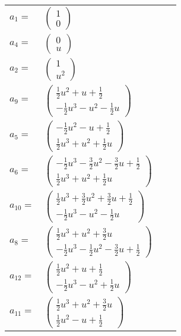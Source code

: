 \documentclass[1p]{elsarticle_modified}
\theoremstyle{definition}
\begin{document}
\begin{tabular}{m{7pt} m{180pt} m{7pt} m{180pt} }
\flushright $a_{1}=$&$\begin{pmatrix}1\\0\end{pmatrix}$ \\
\flushright $a_{4}=$&$\begin{pmatrix}0\\u\end{pmatrix}$ \\
\flushright $a_{2}=$&$\begin{pmatrix}1\\u^2\end{pmatrix}$ \\
\flushright $a_{9}=$&$\begin{pmatrix}\frac{1}{2} u^2+u+\frac{1}{2}\\-\frac{1}{2} u^3- u^2-\frac{1}{2} u\end{pmatrix}$ \\
\flushright $a_{5}=$&$\begin{pmatrix}-\frac{1}{2} u^2- u+\frac{1}{2}\\\frac{1}{2} u^3+u^2+\frac{1}{2} u\end{pmatrix}$ \\
\flushright $a_{6}=$&$\begin{pmatrix}-\frac{1}{2} u^3-\frac{3}{2} u^2-\frac{3}{2} u+\frac{1}{2}\\\frac{1}{2} u^3+u^2+\frac{1}{2} u\end{pmatrix}$ \\
\flushright $a_{10}=$&$\begin{pmatrix}\frac{1}{2} u^3+\frac{3}{2} u^2+\frac{3}{2} u+\frac{1}{2}\\-\frac{1}{2} u^3- u^2-\frac{1}{2} u\end{pmatrix}$ \\
\flushright $a_{8}=$&$\begin{pmatrix}\frac{1}{2} u^3+u^2+\frac{3}{2} u\\-\frac{1}{2} u^3-\frac{1}{2} u^2-\frac{3}{2} u+\frac{1}{2}\end{pmatrix}$ \\
\flushright $a_{12}=$&$\begin{pmatrix}\frac{1}{2} u^2+u+\frac{1}{2}\\-\frac{1}{2} u^3- u^2+\frac{1}{2} u\end{pmatrix}$ \\
\flushright $a_{11}=$&$\begin{pmatrix}\frac{1}{2} u^3+u^2+\frac{3}{2} u\\\frac{1}{2} u^2- u+\frac{1}{2}\end{pmatrix}$ \\

\end{tabular}
\end{document}
